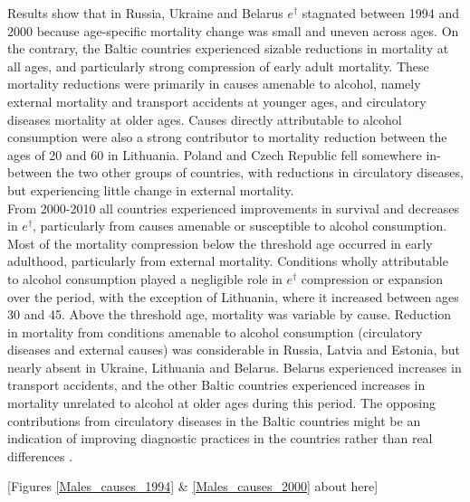 \documentclass{article}
\begin{document}
\begin{spacing}{1.5}
Results show that in Russia, Ukraine and Belarus $e^\dagger$ stagnated between 1994 and 2000 because age-specific mortality change was small and uneven across ages. On the contrary, the Baltic countries experienced sizable reductions in mortality at all ages, and particularly strong compression of early adult mortality. These mortality reductions were primarily in causes amenable to alcohol, namely external mortality and transport accidents at younger ages, and circulatory diseases mortality at older ages. Causes directly attributable to alcohol consumption were also a strong contributor to mortality reduction between the ages of 20 and 60 in Lithuania. Poland and Czech Republic fell somewhere in-between the two other groups of countries, with reductions in circulatory diseases, but experiencing little change in external mortality.\\

From 2000-2010 all countries experienced improvements in survival and decreases in $e^\dagger$, particularly from causes amenable or susceptible to alcohol consumption. Most of the mortality compression below the threshold age occurred in early adulthood, particularly from external mortality. Conditions wholly attributable to alcohol consumption played a negligible role in $e^\dagger$ compression or expansion over the period, with the exception of Lithuania, where it increased between ages 30 and 45. Above the threshold age, mortality was variable by cause. Reduction in mortality from conditions amenable to alcohol consumption (circulatory diseases and external causes) was considerable in Russia, Latvia and Estonia, but nearly absent in Ukraine, Lithuania and Belarus. Belarus experienced increases in transport accidents, and the other Baltic countries experienced increases in mortality unrelated to alcohol at older ages during this period. \textcolor[rgb]{1,0,0}{The opposing contributions from circulatory diseases in the Baltic countries might be an indication of improving diagnostic practices in the countries rather than real differences \citep{jasilionis2011}.
}

\begin{center}
[Figures \ref{Males_causes_1994} \& \ref{Males_causes_2000} about here]\\
\end{center}



\end{spacing}
\end{document}
